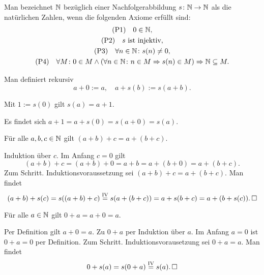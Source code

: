 \begin{Definition}\newlinefirst
Man bezeichnet $\mathbb N$ bezüglich einer Nachfolgerabbildung $s\colon\mathbb N\to\mathbb N$
als die natürlichen Zahlen, wenn die folgenden Axiome erfüllt sind:
\begin{gather*}
\text{(P1)}\quad 0\in\mathbb N,\\
\text{(P2)}\quad \text{$s$ ist injektiv},\\
\text{(P3)}\quad \forall n\in\mathbb N\colon s(n)\ne 0,\\
\text{(P4)}\quad \forall M\colon 0\in M\land (\forall n\in\mathbb N\colon n\in M\Rightarrow s(n)\in M)\Rightarrow \mathbb N\subseteq M.
\end{gather*}
\end{Definition}

\begin{Definition}\newlinefirst
Man definiert rekursiv
\[a+0 := a,\quad a + s(b) := s(a + b).\]
\end{Definition}

\begin{Korollar}
Mit $1:=s(0)$ gilt $s(a) = a+1$.
\end{Korollar}
\begin{Beweis}
Es findet sich $a+1 = a+s(0) = s(a+0) = s(a)$.\,\qedsymbol
\end{Beweis}

\begin{Korollar}\newlinefirst
Für alle $a,b,c\in\mathbb N$ gilt $(a+b)+c = a+(b+c)$.
\end{Korollar}
\begin{Beweis}
Induktion über $c$. Im Anfang $c=0$ gilt
\[(a+b)+c = (a+b)+0 = a+b = a+(b+0) = a+(b+c).\]
Zum Schritt. Induktionsvoraussetzung sei $(a+b)+c = a+(b+c)$. Man findet
\[(a+b)+s(c) = s((a+b)+c) \stackrel{\mathrm{IV}}= s(a+(b+c))
= a+s(b+c) = a+(b+s(c)).\,\square\]
\end{Beweis}

\newpage
\begin{Korollar}%
\label{nat-zero}\newlinefirst
Für alle $a\in\mathbb N$ gilt $0+a = a+0 = a$.
\end{Korollar}
\begin{Beweis}
Per Definition gilt $a+0=a$. Zu $0+a$ per Induktion über $a$.
Im Anfang $a=0$ ist $0+a = 0$ per Definition. Zum Schritt.
Induktionsvorausetzung sei $0+a=a$. Man findet
\[0+s(a) = s(0+a) \stackrel{\mathrm{IV}}= s(a).\,\square\]
\end{Beweis}


